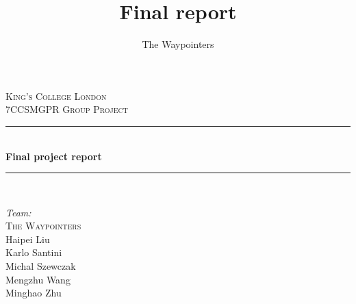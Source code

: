 \documentclass[a4paper,12pt]{article}
\title{Final report}
\author{The Waypointers}
\begin{document}
%
%
%

\begin{titlepage}

\newcommand{\HRule}{\rule{\linewidth}{0.5mm}} %

\center %
 

\textsc{\LARGE King's College London}\\[1.5cm] %
\textsc{\Large 7CCSMGPR Group Project}\\[0.5cm] %


\HRule \\[0.4cm]
{ \huge \bfseries Final project report}\\[0.4cm] %
\HRule \\[1.5cm]
 
\begin{flushleft}
{\Large \emph{Team:}\\
\textsc{The Waypointers}\\}
Haipei Liu\\
Karlo Santini\\
Michal Szewczak\\
Mengzhu Wang\\
Minghao Zhu\\[3cm]
\end{flushleft}


\end{titlepage}
\end{document}
